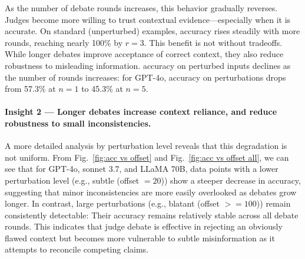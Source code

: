 \documentclass[11pt]{article}
\begin{document}
As the number of debate rounds increases, this behavior gradually reverses. Judges become more willing to trust contextual evidence—especially when it is accurate. On standard (unperturbed) examples, accuracy rises steadily with more rounds, reaching nearly 100\% by \(r = 3\). This benefit is not without tradeoffs. While longer debates improve acceptance of correct context, they also reduce robustness to misleading information. accuracy on perturbed inputs declines as the number of rounds increases: for GPT-4o, accuracy on perturbations drops from 57.3\% at \(n = 1\) to 45.3\% at \(n = 5\).

\paragraph{Insight 2 — Longer debates increase context reliance, and reduce robustness to small inconsistencies.}  

A more detailed analysis by perturbation level reveals that this degradation is not uniform. From Fig.~\ref{fig:acc vs offset} and Fig.~\ref{fig:acc vs offset all}, we can see that for GPT-4o, sonnet 3.7, and LLaMA 70B, data points with a lower perturbation level (e.g., subtle (offset \(= 20\))) show a steeper decrease in accuracy, suggesting that minor inconsistencies are more easily overlooked as debates grow longer. In contrast, large perturbations (e.g., blatant (offset \(>= 100\))) remain consistently detectable: Their accuracy remains relatively stable across all debate rounds. This indicates that judge debate is effective in rejecting an obviously flawed context but becomes more vulnerable to subtle misinformation as it attempts to reconcile competing claims. 


\end{document}
